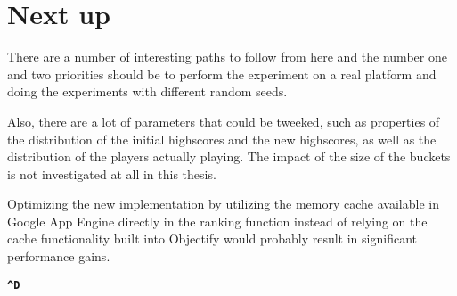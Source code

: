 \section*{Next up}

There are a number of interesting paths to follow from here and the number one and two priorities should be to perform the experiment on a real platform and doing the experiments with different random seeds.

Also, there are a lot of parameters that could be tweeked, such as properties of the distribution of the initial highscores and the new highscores, as well as the distribution of the players actually playing. The impact of the size of the buckets is not investigated at all in this thesis.

Optimizing the new implementation by utilizing the memory cache available in Google App Engine directly in the ranking function instead of relying on the cache functionality built into Objectify would probably result in significant performance gains.

\vspace{20mm}
\textbf{\Huge
\texttt{\^}\texttt{D}}

